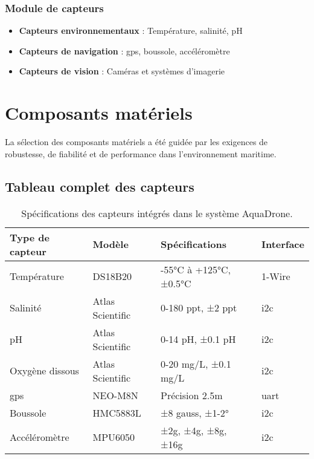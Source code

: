 {\subsubsection{Module de capteurs}
\begin{itemize}
    \item \textbf{Capteurs environnementaux} : Température, salinité, pH
    \item \textbf{Capteurs de navigation} : \gls{gps}, boussole, accéléromètre
    \item \textbf{Capteurs de vision} : Caméras et systèmes d'imagerie
\end{itemize}

\section{Composants matériels}
La sélection des composants matériels a été guidée par les exigences de robustesse, de fiabilité et de performance dans l'environnement maritime.

\subsection{Tableau complet des capteurs}
\begin{table}[!htpb]
    \caption{Spécifications des capteurs intégrés dans le système AquaDrone.}
    \label{tab:capteurs}
    \centering
    \begin{tabular}{llll}
        \toprule
        \textbf{Type de capteur} & \textbf{Modèle} & \textbf{Spécifications} & \textbf{Interface} \\ 
        \midrule
        Température & DS18B20 & -55°C à +125°C, ±0.5°C & 1-Wire \\
        Salinité & Atlas Scientific & 0-180 ppt, ±2 ppt & \gls{i2c} \\
        pH & Atlas Scientific & 0-14 pH, ±0.1 pH & \gls{i2c} \\
        Oxygène dissous & Atlas Scientific & 0-20 mg/L, ±0.1 mg/L & \gls{i2c} \\
        \gls{gps} & NEO-M8N & Précision 2.5m & \gls{uart} \\
        Boussole & HMC5883L & ±8 gauss, ±1-2° & \gls{i2c} \\
        Accéléromètre & MPU6050 & ±2g, ±4g, ±8g, ±16g & \gls{i2c} \\
        \bottomrule
    \end{tabular}
\end{table}

}
